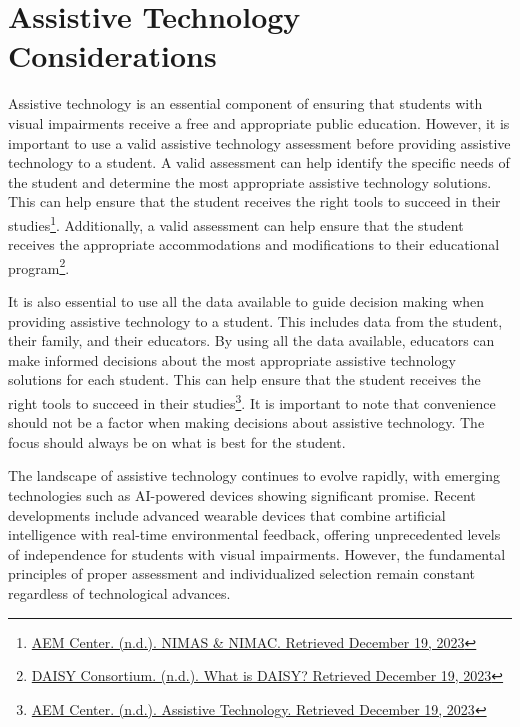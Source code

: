 \chapter{Assistive Technology Considerations}\label{trouble3}
Assistive technology is an essential component of ensuring that students with visual impairments receive a free and appropriate public education. However, it is important to use a valid assistive technology assessment before providing assistive technology to a student. A valid assessment can help identify the specific needs of the student and determine the most appropriate assistive technology solutions. This can help ensure that the student receives the right tools to succeed in their studies\footnote{\raggedright \href{https://aem.cast.org/nimas-nimac/nimas-nimac}{AEM Center. (n.d.). NIMAS \& NIMAC. Retrieved December 19, 2023}}. Additionally, a valid assessment can help ensure that the student receives the appropriate accommodations and modifications to their educational program\footnote{\raggedright \href{https://daisy.org/about_us/what-is-daisy/}{DAISY Consortium. (n.d.). What is DAISY? Retrieved December 19, 2023}}.

It is also essential to use all the data available to guide decision making when providing assistive technology to a student. This includes data from the student, their family, and their educators. By using all the data available, educators can make informed decisions about the most appropriate assistive technology solutions for each student. This can help ensure that the student receives the right tools to succeed in their studies\footnote{\raggedright \href{https://aem.cast.org/learn/assistive-technology}{AEM Center. (n.d.). Assistive Technology. Retrieved December 19, 2023}}. It is important to note that convenience should not be a factor when making decisions about assistive technology. The focus should always be on what is best for the student.

The landscape of assistive technology continues to evolve rapidly, with emerging technologies such as AI-powered devices showing significant promise. Recent developments include advanced wearable devices that combine artificial intelligence with real-time environmental feedback, offering unprecedented levels of independence for students with visual impairments. However, the fundamental principles of proper assessment and individualized selection remain constant regardless of technological advances.

